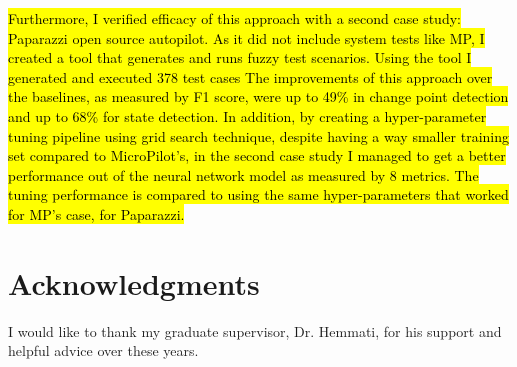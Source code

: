 \hl{Furthermore, I verified efficacy of this approach with a second case study: Paparazzi open source autopilot. As it did not include system tests like MP, I created a tool that generates and runs fuzzy test scenarios. Using the tool I generated and executed 378 test cases %
The improvements of this approach over the baselines, as measured by F1 score, were up to 49\% in change point detection and up to 68\% for state detection.
In addition, by creating a hyper-parameter tuning pipeline using grid search technique, despite having a way smaller training set compared to MicroPilot's, in the second case study I managed to get a better performance out of the neural network model as measured by 8 metrics. The tuning performance is compared to using the same hyper-parameters that worked for MP's case, for Paparazzi.}%




\chapter{Acknowledgments}
I would like to thank my graduate supervisor, Dr. Hemmati, for his support and helpful advice over these years. 



\dedication{To the ones who made this a smoother journey.} 


\tableofcontents


\listoftables


\listoffigures

